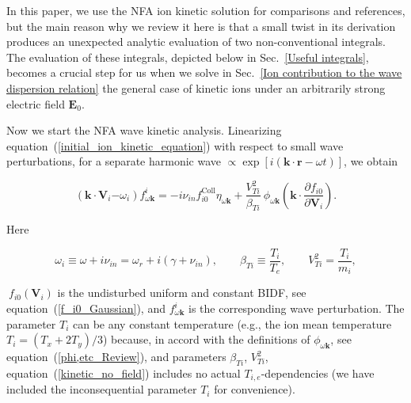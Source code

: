 \documentclass[draft]{agujournal2019}
\renewcommand{\vec}{\mathbf}
\begin{document}
{In this paper, we use the NFA ion kinetic solution for comparisons and references, but the 
main reason why we review it here is that a small twist in its derivation
produces an unexpected analytic evaluation of two non-conventional integrals. 
The evaluation of these integrals, depicted below in Sec.~\ref{Useful integrals}, 
becomes a crucial step for us when we solve in Sec.~\ref{Ion contribution to the wave dispersion relation} 
the general case of kinetic ions under an arbitrarily strong electric field $\vec{E}_{0}$. 

Now we start the NFA wave kinetic analysis. Linearizing equation~(\ref{initial_ion_kinetic_equation}) with respect to
small wave perturbations, for a separate harmonic wave $\propto\exp[i(\vec{k}\cdot\vec{r}-\omega t)]$, we obtain
\begin{linenomath*}
\begin{equation}
(\vec{k}\cdot\vec{V}_{i}\mathbf{-}\omega_{i})f_{\omega\vec{k}}^{i}=-i\nu
_{in}f_{i0}^{\mathrm{Coll}}\eta_{\omega\vec{k}}+\frac{V_{Ti}^{2}}{\beta_{Ti}
}\ \phi_{\omega\vec{k}}\left(  \vec{k}\cdot\frac{\partial f_{i0}}{\partial
\vec{V}_{i}}\right). 
\label{kinetic_no_field}
\end{equation}
\end{linenomath*}
Here
\begin{linenomath*}
\begin{equation}
\omega_{i}\equiv\omega+i\nu_{in} = \omega_r+i(\gamma + \nu_{in}),\qquad\beta_{Ti}\equiv\frac{T_{i}}{T_{e}},\qquad
V_{Ti}^{2}=\frac{T_{i}}{m_{i}}, 
\label{rho,beta_T,T_i}
\end{equation}
\end{linenomath*}
$\ f_{i0}(\vec{V}_{i})$ is the undisturbed uniform and constant BIDF, see
equation~(\ref{f_i0_Gaussian}), and $f_{\omega\vec{k}}^{i}$ is the
corresponding wave perturbation. The parameter $T_{i}$ can be any constant temperature
(e.g., the ion mean temperature $T_{i}=(T_{x}+2T_{y})/3$) because,
in accord with the definitions of $\phi_{\omega\vec{k}}$, see 
equation~(\ref{phi,etc_Review}), and parameters $\beta_{Ti}$, $V_{Ti}^{2}$,
equation~(\ref{kinetic_no_field}) includes no actual $T_{i,e}$-dependencies (we
have included the inconsequential parameter $T_i$ for convenience).

}
\end{document}
